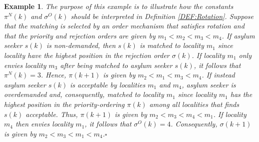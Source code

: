 \documentclass[12pt,fleqn]{article}
\newtheorem{example}{Example}
\begin{document}
\begin{example}\rm\label{EX:Rotation}
The purpose of this example is to illustrate how the constants $\pi^N(k)$ and $\sigma^O(k)$ should be interpreted in Definition \ref{DEF:Rotation}. Suppose that the matching is selected by an order mechanism that satisfies rotation and that the priority and rejection orders are given by $m_1<m_2<m_3<m_4$. If asylum seeker $s(k)$ is non-demanded, then $s(k)$ is matched to locality $m_1$ since locality have the highest position in the rejection order $\sigma(k)$. If locality $m_1$ only envies locality $m_3$ after being matched to asylum seeker $s(k)$, it follows that $\pi^N(k)=3$. Hence, $\pi(k+1)$ is given by $m_2<m_1<m_3<m_4$. If instead asylum seeker $s(k)$ is acceptable by localities $m_1$ and $m_4$, asylum seeker is overdemanded and, consequently, matched to locality $m_1$ since locality $m_1$ has the highest position in the priority-ordering $\pi(k)$ among all localities that finds $s(k)$ acceptable. Thus, $\pi(k+1)$ is given by $m_2<m_3<m_4<m_1$. If locality $m_4$ then envies locality $m_1$, it follows that $\sigma^O(k)=4$. Consequently, $\sigma(k+1)$ is given by $m_2<m_3<m_1<m_4$.\hfill $\square$
\end{example}
\end{document}
